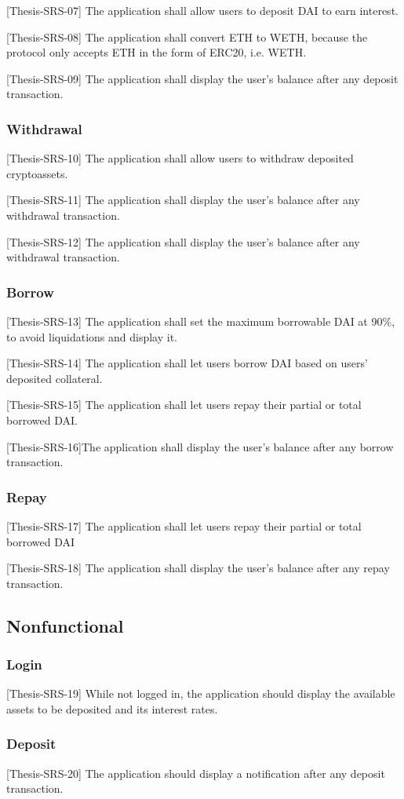 \documentclass[11pt,a4paper]{report}
\begin{document}
[Thesis-SRS-07] The application shall allow users to deposit DAI to earn interest.

[Thesis-SRS-08] The application shall convert ETH to WETH, because the protocol only accepts ETH in the form of ERC20, i.e. WETH.

[Thesis-SRS-09] The application shall display the user's balance after any deposit transaction.

\subsubsection{Withdrawal}
[Thesis-SRS-10] The application shall allow users to withdraw deposited cryptoassets.

[Thesis-SRS-11] The application shall display the user's balance after any withdrawal transaction.

[Thesis-SRS-12] The application shall display the user's balance after any withdrawal transaction.
\subsubsection{Borrow}
[Thesis-SRS-13] The application shall set the maximum borrowable DAI at 90\%, to avoid liquidations and display it.

[Thesis-SRS-14] The application shall let users borrow DAI based on users' deposited collateral.

[Thesis-SRS-15] The application shall let users repay their partial or total borrowed DAI. 

[Thesis-SRS-16]The application shall display the user's balance after any borrow transaction.
\subsubsection{Repay}
[Thesis-SRS-17] The application shall let users repay their partial or total borrowed DAI 

[Thesis-SRS-18] The application shall display the user's balance after any repay transaction.
\subsection{Nonfunctional}
\subsubsection{Login}
[Thesis-SRS-19] While not logged in, the application should display the available assets to be deposited and its interest rates. 
\subsubsection{Deposit}
[Thesis-SRS-20] The application should display a notification after any deposit transaction.
\end{document}
